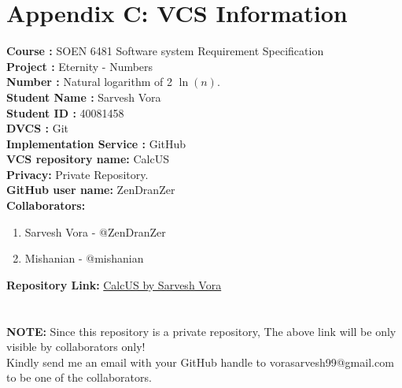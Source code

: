 \documentclass{article}
\begin{document}
\newpage
\section{Appendix C: VCS Information}
\textbf{Course : }SOEN 6481 Software system Requirement Specification \\
\textbf{Project :} Eternity - Numbers\\
\textbf{Number : } Natural logarithm of 2 $\ln(n)$.\\
\textbf{Student Name :} Sarvesh Vora\\
\textbf{Student ID : } 40081458 \\
\textbf{DVCS :} Git\\
\textbf{Implementation Service :} GitHub\\
\textbf{VCS repository name: }CalcUS\\
\textbf{Privacy: }Private Repository. \\
\textbf{GitHub user name: }ZenDranZer\\
\noindent
\textbf{Collaborators: }
\begin{enumerate}
    \item Sarvesh Vora - @ZenDranZer
    \item Mishanian - @mishanian
\end{enumerate}
\textbf{Repository Link: } \href{https://github.com/ZenDranZer/CalcUS}{CalcUS by Sarvesh Vora} \\ \\ \\ 
\noindent
\textbf{NOTE: } Since this repository is a private repository, The above link will be only visible by collaborators only! \\ Kindly send me an email with your GitHub handle to vorasarvesh99@gmail.com to be one of the collaborators.
\end{document}
